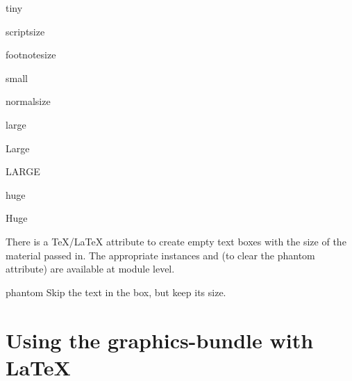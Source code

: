 \begin{memberdesc}{tiny}
\end{memberdesc}

\begin{memberdesc}{scriptsize}
\end{memberdesc}

\begin{memberdesc}{footnotesize}
\end{memberdesc}

\begin{memberdesc}{small}
\end{memberdesc}

\begin{memberdesc}{normalsize}
\end{memberdesc}

\begin{memberdesc}{large}
\end{memberdesc}

\begin{memberdesc}{Large}
\end{memberdesc}

\begin{memberdesc}{LARGE}
\end{memberdesc}

\begin{memberdesc}{huge}
\end{memberdesc}

\begin{memberdesc}{Huge}
\end{memberdesc}

There is a \TeX/\LaTeX{} attribute to create empty text boxes with the
size of the material passed in. The appropriate instances
 and  (to clear the phantom
attribute) are available at module level.

\begin{datadesc}{phantom}
  Skip the text in the box, but keep its size.
\end{datadesc}

\section{Using the graphics-bundle with \LaTeX}

